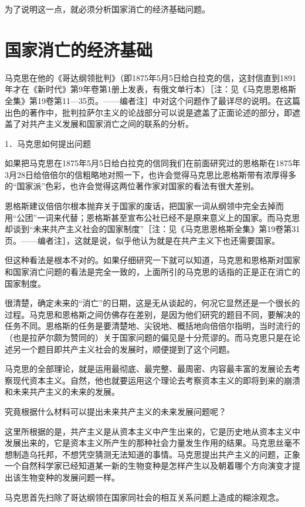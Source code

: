 \documentclass[UTF8, 12pt, a4paper]{ctexrep}
\begin{document}
为了说明这一点，就必须分析国家消亡的经济基础问题。

\chapter{国家消亡的经济基础}

马克思在他的《哥达纲领批判》（即1875年5月5日给白拉克的信，这封信直到1891年才在《新时代》第9年卷第1册上发表，有俄文单行本）［注：见《马克思恩格斯全集》第19卷第11—35页。——编者注］中对这个问题作了最详尽的说明。在这篇出色的著作中，批判拉萨尔主义的论战部分可以说是遮盖了正面论述的部分，即遮盖了对共产主义发展和国家消亡之间的联系的分析。

1．马克思如何提出问题

如果把马克思在1875年5月5日给白拉克的信同我们在前面研究过的恩格斯在1875年3月28日给倍倍尔的信粗略地对照一下，也许会觉得马克思比恩格斯带有浓厚得多的“国家派”色彩，也许会觉得这两位著作家对国家的看法有很大差别。

恩格斯建议倍倍尔根本抛弃关于国家的废话，把国家一词从纲领中完全去掉而用“公团”一词来代替；恩格斯甚至宣布公社已经不是原来意义上的国家。而马克思却谈到“未来共产主义社会的国家制度”［注：见《马克思恩格斯全集》第19卷第31页。——编者注］，这就是说，似乎他认为就是在共产主义下也还需要国家。

但这种看法是根本不对的。如果仔细研究一下就可以知道，马克思和恩格斯对国家和国家消亡问题的看法是完全一致的，上面所引的马克思的话指的正是正在消亡的国家制度。

很清楚，确定未来的“消亡”的日期，这是无从谈起的，何况它显然还是一个很长的过程。马克思和恩格斯之间仿佛存在差别，是因为他们研究的题目不同，要解决的任务不同。恩格斯的任务是要清楚地、尖锐地、概括地向倍倍尔指明，当时流行的（也是拉萨尔颇为赞同的）关于国家问题的偏见是十分荒谬的。而马克思只是在论述另一个题目即共产主义社会的发展时，顺便提到了这个问题。

马克思的全部理论，就是运用最彻底、最完整、最周密、内容最丰富的发展论去考察现代资本主义。自然，他也就要运用这个理论去考察资本主义的即将到来的崩溃和未来共产主义的未来的发展。

究竟根据什么材料可以提出未来共产主义的未来发展问题呢？

这里所根据的是，共产主义是从资本主义中产生出来的，它是历史地从资本主义中发展出来的，它是资本主义所产生的那种社会力量发生作用的结果。马克思丝毫不想制造乌托邦，不想凭空猜测无法知道的事情。马克思提出共产主义的问题，正象一个自然科学家已经知道某一新的生物变种是怎样产生以及朝着哪个方向演变才提出该生物变种的发展问题一样。

马克思首先扫除了哥达纲领在国家同社会的相互关系问题上造成的糊涂观念。
\end{document}

